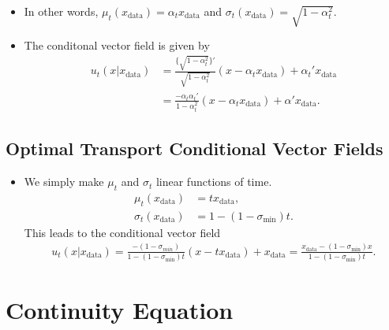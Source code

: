 \documentclass[10pt]{article}
\newcommand{\data}{\mathrm{data}}
\begin{document}
\begin{itemize}
\begin{itemize}
    \item In other words, $\mu_t(x_{\data}) = \alpha_t x_{\data}$ and $\sigma_t(x_{\data}) = \sqrt{1-\alpha_t^2}$.
    
    \item The conditonal vector field is given by
    \begin{align*}
      u_t(x|x_{\data}) 
      &= \frac{\{ \sqrt{1 - \alpha_t^2} \}' }{\sqrt{1-\alpha_t^2}} (x - \alpha_t x_{\data}) + \alpha_t' x_{\data} \\
      &= \frac{-\alpha_t \alpha_t'}{1 - \alpha_t^2}(x - \alpha_t x_{\data}) + \alpha' x_{\data}.
    \end{align*}
  \end{itemize}
\end{itemize}

\subsection{Optimal Transport Conditional Vector Fields}

\begin{itemize}
  \item We simply make $\mu_t$ and $\sigma_t$ linear functions of time.
  \begin{align*}
    \mu_t(x_{\data}) &= t x_{\data}, \\
    \sigma_t(x_{\data}) &= 1 - (1-\sigma_{\min})t.
  \end{align*}
  This leads to the conditional vector field
  \begin{align*}
    u_t(x|x_{\data}) = \frac{-(1-\sigma_{min})}{1 - (1-\sigma_{\min}) t} (x - t x_{\data}) + x_{\data} = \frac{x_{\data} - (1-\sigma_{\min})x}{1 - (1-\sigma_{\min}) t}.
  \end{align*}
\end{itemize}

\appendix

\section{Continuity Equation}
\end{document}
